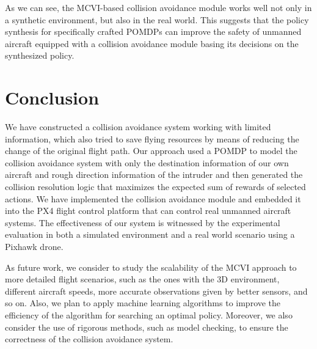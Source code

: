 \documentclass{article}
\begin{document}
As we can see, the MCVI-based collision avoidance module works well not only in a synthetic environment, but also in the real world.
This suggests that the policy synthesis for specifically crafted POMDPs can improve the safety of unmanned aircraft equipped with a collision avoidance module basing its decisions on the synthesized policy.



\section{Conclusion}
\label{sec:conclusion}

We have constructed a collision avoidance system working with limited information, which also tried to save flying resources by means of reducing the change of the original flight path.
Our approach used a POMDP to model the collision avoidance system with only the destination information of our own aircraft and rough direction information of the intruder and then generated the collision resolution logic that maximizes the expected sum of rewards of selected actions.
We have implemented the collision avoidance module and embedded it into the PX4 flight control platform that can control real unmanned aircraft systems.
The effectiveness of our system is witnessed by the experimental evaluation in both a simulated environment and a real world scenario using a Pixhawk drone.

As future work, we consider to study the scalability of the MCVI approach to more detailed flight scenarios, such as the ones with the 3D environment, different aircraft speeds, more accurate observations given by better sensors, and so on.
Also, we plan to apply machine learning algorithms to improve the efficiency of the algorithm for searching an optimal policy.
Moreover, we also consider the use of rigorous methods, such as model checking, to ensure the correctness of the collision avoidance system.
\end{document}
